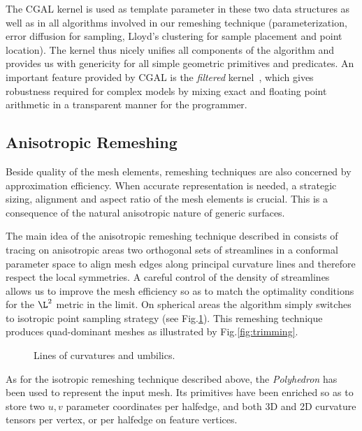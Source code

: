 The CGAL kernel is used as template parameter in these two data
structures as well as in all algorithms involved in our remeshing
technique (parameterization, error diffusion for sampling, Lloyd's
clustering for sample placement and point location). The kernel thus
nicely unifies all components of the algorithm and provides us with
genericity for all simple geometric primitives and predicates. An
important feature provided by CGAL is the \emph{filtered}
kernel~\cite{bbp-iayed-01,p-iaeia-99}, which gives robustness required
for complex models by mixing exact and floating point arithmetic in a
transparent manner for the programmer.

\subsection{Anisotropic Remeshing}


Beside quality of the mesh elements, remeshing techniques are also
concerned by approximation efficiency. When accurate representation is
needed, a strategic sizing, alignment and aspect ratio of the mesh
elements is crucial. This is a consequence of the natural anisotropic
nature of generic surfaces.


The main idea of the anisotropic remeshing technique described in
\cite{acdld-apr-03} consists of tracing on anisotropic areas two 
orthogonal sets of streamlines in a conformal parameter space to align
mesh edges along principal curvature lines and therefore respect the
local symmetries. A careful control of the density of streamlines
allows us to improve the mesh efficiency so as to match the optimality
conditions for the $\L^2$ metric in the limit. On spherical areas the
algorithm simply switches to isotropic point sampling strategy (see
Fig.\ref{fig:anisotropic}). This remeshing technique produces
quad-dominant meshes as illustrated by Fig.\ref{fig:trimming}.

\begin{figure}
  \centering
  \caption{Lines of curvatures and umbilics.}
  \label{fig:anisotropic}
\end{figure}


As for the isotropic remeshing technique described above, the
\emph{Polyhedron} has been used to represent the input mesh. Its
primitives have been enriched so as to store two $u,v$ parameter
coordinates per halfedge, and both 3D and 2D curvature tensors per
vertex, or per halfedge on feature vertices.

